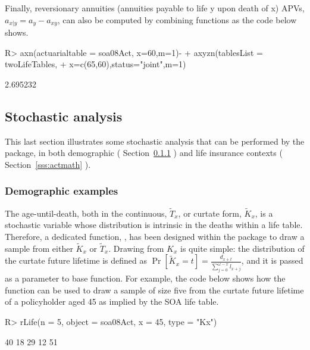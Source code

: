 \documentclass[nojss]{jss}
\begin{document}
Finally, reversionary annuities (annuities payable to life y upon death of x)
APVs, $a_{x|y}=a_{y} - a_{xy}$, can also be computed by combining
 functions as the code below shows.

\begin{Schunk}
\begin{Sinput}
R> axn(actuarialtable = soa08Act, x=60,m=1)-
+  		axyzn(tablesList = twoLifeTables, 
+  				x=c(65,60),status="joint",m=1)
\end{Sinput}
\begin{Soutput}
[1] 2.695232
\end{Soutput}
\end{Schunk}


\subsection{Stochastic analysis}\label{ss:stochastic}
This last section illustrates some stochastic analysis that can be performed by the 
 package, in both demographic (
Section~\ref{sss:demo} ) and life insurance contexts (
Section~\ref{sss:actmath} ).\\

\subsubsection{Demographic examples}\label{sss:demo}

The age-until-death, both in the continuous, $\tilde T_x$,  or curtate form, $\tilde K_x$, is a stochastic variable whose 
distribution is intrinsic in the deaths within a life table.  Therefore, a
dedicated function, , has been designed within
the  package to draw a sample from either  $\tilde K_x$ or $\tilde T_x$. Drawing from $K_x$ is quite simple: the distribution of the curtate future lifetime is defined as
$\Pr \left[ {{{\tilde K}_x} = t} \right] = \frac{{{d_{x + t}}}}{{\sum\limits_{j = 0}^{\omega  - x} {{l_{x + j}}} }}$, and it is passed as a
 parameter to base   function. For example,
the code below shows how the  function can be used to draw a sample of
size five from the curtate future lifetime of a policyholder aged 45 as implied by
the SOA life table.

\begin{Schunk}
\begin{Sinput}
R> rLife(n = 5, object = soa08Act, x = 45, type = "Kx")
\end{Sinput}
\begin{Soutput}
[1] 40 18 29 12 51
\end{Soutput}
\end{Schunk}
\end{document}
